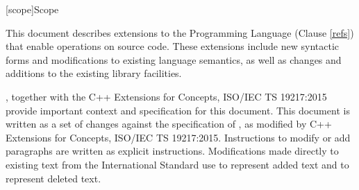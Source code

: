
[scope]{Scope}

\pnum
This document describes extensions to the \Cpp Programming
Language (Clause \ref{refs}) that enable operations on source code. These
extensions include new syntactic forms and modifications to existing language
semantics, as well as changes and additions to the existing library facilities.

\pnum
{\cppstddocno}, together with the C++ Extensions for
Concepts, ISO/IEC TS 19217:2015 provide important context and specification for
this document. This document is written as a set of changes against the
specification of {\cppstddocno}, as modified by C++ Extensions for Concepts,
ISO/IEC TS 19217:2015.  Instructions to modify or add paragraphs are written as
explicit instructions.  Modifications made directly to existing text from the
International Standard use  to represent added text and
 to represent deleted text.
